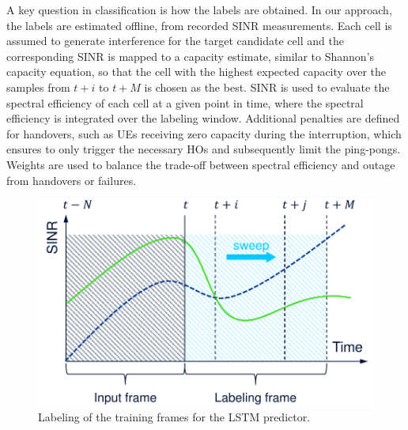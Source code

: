 			A key question in classification is how the labels are obtained.
			In our approach, the labels are estimated offline, from recorded \ac{SINR} measurements.
			Each cell is assumed to generate interference for the target candidate cell and the corresponding \ac{SINR} is mapped to a capacity estimate, similar to Shannon's capacity equation, so that the cell with the highest expected capacity over the samples from $t+i$ to $t+M$ is chosen as the best.			
			\ac{SINR} is used to evaluate the spectral efficiency of each cell at a given point in time, where the spectral efficiency is integrated over the labeling window.
			Additional penalties are defined for handovers, such as \acp{UE} receiving zero capacity during the interruption, which ensures to only trigger the necessary \acp{HO} and subsequently limit the ping-pongs.
			Weights are used to balance the trade-off between spectral efficiency and outage from handovers or failures.		
			
			\begin{figure}[ht]
				\centering
				\includegraphics[width=0.5\linewidth]{figures/09_pred_ho/pred_ho_labeling/pred_ho_labeling.pdf}
				\caption[Labeling the training frames for predictive handover]{Labeling of the training frames for the LSTM predictor.}
				\label{fig:pred_ho_labeling}
			\end{figure}
			
